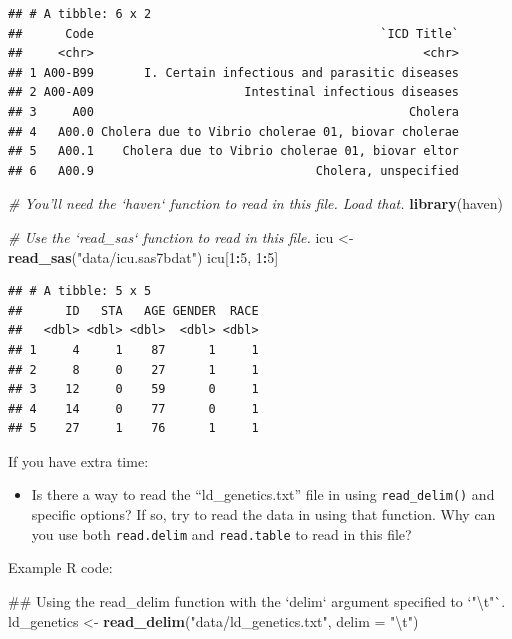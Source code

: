 \documentclass[]{book}
\makeatletter
\newenvironment{Shaded}{\begin{snugshade}}{\end{snugshade}}
\newcommand{\KeywordTok}[1]{\textcolor[rgb]{0.13,0.29,0.53}{\textbf{#1}}}
\newcommand{\DataTypeTok}[1]{\textcolor[rgb]{0.13,0.29,0.53}{#1}}
\newcommand{\DecValTok}[1]{\textcolor[rgb]{0.00,0.00,0.81}{#1}}
\newcommand{\CharTok}[1]{\textcolor[rgb]{0.31,0.60,0.02}{#1}}
\newcommand{\StringTok}[1]{\textcolor[rgb]{0.31,0.60,0.02}{#1}}
\newcommand{\CommentTok}[1]{\textcolor[rgb]{0.56,0.35,0.01}{\textit{#1}}}
\newcommand{\OperatorTok}[1]{\textcolor[rgb]{0.81,0.36,0.00}{\textbf{#1}}}
\newcommand{\NormalTok}[1]{#1}
\providecommand{\tightlist}{%
  \setlength{\itemsep}{0pt}\setlength{\parskip}{0pt}}
\newenvironment{kframe}{%
\medskip{}
\setlength{\fboxsep}{.8em}
 \def\at@end@of@kframe{}%
 \ifinner\ifhmode%
  \def\at@end@of@kframe{\end{minipage}}%
  \begin{minipage}{\columnwidth}%
 \fi\fi%
 \def\FrameCommand##1{\hskip\@totalleftmargin \hskip-\fboxsep
 \colorbox{shadecolor}{##1}\hskip-\fboxsep
     \hskip-\linewidth \hskip-\@totalleftmargin \hskip\columnwidth}%
 \MakeFramed {\advance\hsize-\width
   \@totalleftmargin\z@ \linewidth\hsize
   \@setminipage}}%
 {\par\unskip\endMakeFramed%
 \at@end@of@kframe}
\renewenvironment{Shaded}{\begin{kframe}}{\end{kframe}}
\theoremstyle{definition}
\theoremstyle{definition}
\theoremstyle{definition}
\theoremstyle{remark}
\makeatother
\begin{document}
\begin{verbatim}
## # A tibble: 6 x 2
##      Code                                        `ICD Title`
##     <chr>                                              <chr>
## 1 A00-B99       I. Certain infectious and parasitic diseases
## 2 A00-A09                     Intestinal infectious diseases
## 3     A00                                            Cholera
## 4   A00.0 Cholera due to Vibrio cholerae 01, biovar cholerae
## 5   A00.1    Cholera due to Vibrio cholerae 01, biovar eltor
## 6   A00.9                               Cholera, unspecified
\end{verbatim}

\begin{Shaded}
\begin{Highlighting}[]
\CommentTok{# You'll need the `haven` function to read in this file. Load that.}
\KeywordTok{library}\NormalTok{(haven)}

\CommentTok{# Use the `read_sas` function to read in this file.}
\NormalTok{icu <-}\StringTok{ }\KeywordTok{read_sas}\NormalTok{(}\StringTok{"data/icu.sas7bdat"}\NormalTok{)}
\NormalTok{icu[}\DecValTok{1}\OperatorTok{:}\DecValTok{5}\NormalTok{, }\DecValTok{1}\OperatorTok{:}\DecValTok{5}\NormalTok{]}
\end{Highlighting}
\end{Shaded}

\begin{verbatim}
## # A tibble: 5 x 5
##      ID   STA   AGE GENDER  RACE
##   <dbl> <dbl> <dbl>  <dbl> <dbl>
## 1     4     1    87      1     1
## 2     8     0    27      1     1
## 3    12     0    59      0     1
## 4    14     0    77      0     1
## 5    27     1    76      1     1
\end{verbatim}

If you have extra time:

\begin{itemize}
\tightlist
\item
  Is there a way to read the ``ld\_genetics.txt'' file in using
  \texttt{read\_delim()} and specific options? If so, try to read the
  data in using that function. Why can you use both \texttt{read.delim}
  and \texttt{read.table} to read in this file?
\end{itemize}

Example R code:

\begin{Shaded}
\begin{Highlighting}[]
\NormalTok{## Using the read_delim function with the `delim` argument specified to `"\textbackslash{}t"`.}
\NormalTok{ld_genetics <-}\StringTok{ }\KeywordTok{read_delim}\NormalTok{(}\StringTok{"data/ld_genetics.txt"}\NormalTok{, }\DataTypeTok{delim =} \StringTok{"}\CharTok{\textbackslash{}t}\StringTok{"}\NormalTok{)}
\end{Highlighting}
\end{Shaded}
\end{document}
